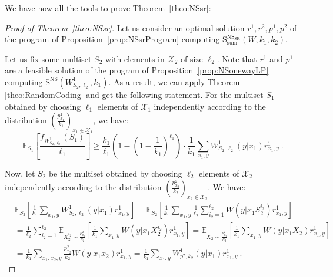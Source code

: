 We have now all the tools to prove Theorem~\ref{theo:NSsr}:

\begin{proof}[Proof of Theorem~\ref{theo:NSsr}]
  Let us consider an optimal solution $r^1,r^2,p^1,p^2$ of the program of Proposition~\ref{prop:NSsrProgram} computing $\mathrm{S}_{\text{sum}}^{\mathrm{NS}_{\mathrm{SR}}}(W,k_1,k_2)$.

  Let us fix some multiset $S_2$ with elements in $\mathcal{X}_2$ of size $\ell_2$. Note that $r^1$ and $p^1$ are a feasible solution of the program of Proposition~\ref{prop:NSonewayLP} computing $\mathrm{S}^{\mathrm{NS}}(W^1_{S_2,\ell_2},k_1)$. As a result, we can apply Theorem \ref{theo:RandomCoding} and get the following statement. For the multiset $S_1$ obtained by choosing $\ell_1$ elements of $\mathcal{X}_1$ independently according to the distribution $\left(\frac{p^1_{x_1}}{k_1}\right)_{x_1 \in \mathcal{X}_1}$, we have:
  \[ \mathbb{E}_{S_1}\left[ \frac{f_{W^1_{S_2,\ell_2}}(S_1)}{\ell_1}\right] \geq \frac{k_1}{\ell_1}\left(1-\left(1-\frac{1}{k_1}\right)^{\ell_1}\right) \cdot \frac{1}{k_1}\sum_{x_1,y} W^1_{S_2,\ell_2}(y|x_1)r^1_{x_1,y} \ .\]

  Now, let $S_2$ be the multiset obtained by choosing $\ell_2$ elements of $\mathcal{X}_2$ independently according to the distribution $\left(\frac{p^2_{x_2}}{k_2}\right)_{x_2 \in \mathcal{X}_2}$. We have:
  \begin{equation}
    \begin{aligned}
      &\mathbb{E}_{S_2}\left[\frac{1}{k_1}\sum_{x_1,y}W^1_{S_2,\ell_2}(y|x_1)r^1_{x_1,y}\right] = \mathbb{E}_{S_2}\left[\frac{1}{k_1}\sum_{x_1,y}\frac{1}{\ell_2}\sum_{i_2=1}^{\ell_2}W(y|x_1S_2^{i_2})r^1_{x_1,y}\right]\\
      &= \frac{1}{\ell_2}\sum_{i_2=1}^{\ell_2}\mathbb{E}_{X^{i_2}_2 \sim \frac{p^2_{x_2}}{k_2}}\left[\frac{1}{k_1}\sum_{x_1,y}W(y|x_1X^{i_2}_2)r^1_{x_1,y}\right] = \mathbb{E}_{X_2 \sim \frac{p^2_{x_2}}{k_2}}\left[\frac{1}{k_1}\sum_{x_1,y}W(y|x_1X_2)r^1_{x_1,y}\right]\\
      &= \frac{1}{k_1}\sum_{x_1,x_2,y}\frac{p^2_{x_2}}{k_2}W(y|x_1x_2)r^1_{x_1,y} = \frac{1}{k_1}\sum_{x_1,y}W^1_{p^2,k_2}(y|x_1)r^1_{x_1,y} \ .
    \end{aligned}
  \end{equation}


\end{proof}
